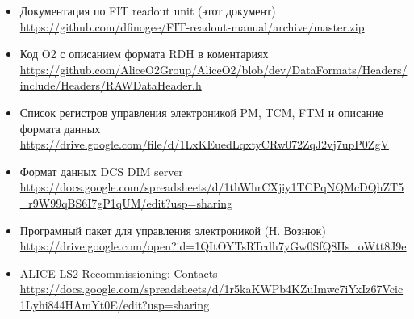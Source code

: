 \documentclass{article}
\begin{document}
\begin{itemize}
\item Документация по FIT readout unit (этот документ)
\url{https://github.com/dfinogee/FIT-readout-manual/archive/master.zip}

\item Код O2 с описанием формата RDH в коментариях
\url{https://github.com/AliceO2Group/AliceO2/blob/dev/DataFormats/Headers/include/Headers/RAWDataHeader.h}

\item Список регистров управления электроникой PM, TCM, FTM и описание формата данных
\url{https://drive.google.com/file/d/1LxKEuedLqxtyCRw072ZqJ2vj7upP0ZgV}

\item Формат данных DCS DIM server
\url {https://docs.google.com/spreadsheets/d/1thWhrCXjiy1TCPqNQMcDQhZT5_r9W99qBS6I7gP1qUM/edit?usp=sharing}

\item Програмный пакет для управления электроникой (Н. Вознюк)
\url {https://drive.google.com/open?id=1QItOYTsRTcdh7yGw0SfQ8Hs_oWtt8J9e}

\item ALICE LS2 Recommissioning: Contacts
\url {https://docs.google.com/spreadsheets/d/1r5kaKWPb4KZuImwc7iYxIz67Vcic1Lyhi844HAmYt0E/edit?usp=sharing}
\end{itemize}
\end{document}
